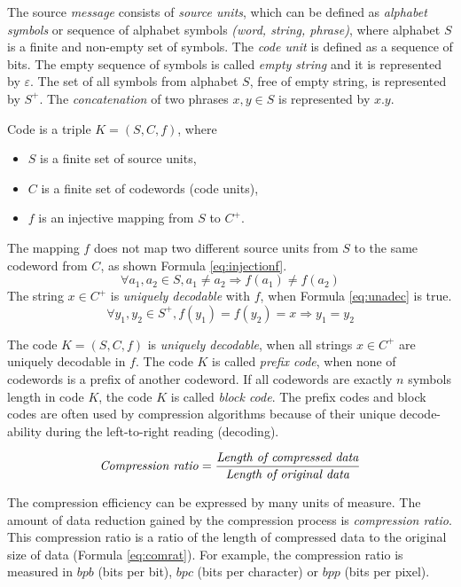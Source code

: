 \documentclass[thesis=M,english]{FITthesis}[2012/10/20]
\begin{document}
The source \textit{message} consists of \textit{source units}, which can be defined as \textit{alphabet symbols} or sequence of alphabet symbols \textit{(word, string, phrase)}, where alphabet $S$ is a finite and non-empty set of symbols. The \textit{code unit} is defined as a sequence of bits. The empty sequence of symbols is called \textit{empty string} and it is represented by $\varepsilon$. The set of all symbols from alphabet $S$, free of empty string, is represented by $S^+$. The \textit{concatenation} of two phrases $x,y \in S$ is represented by $x.y$.

Code is a triple $K=(S,C,f)$, where

\begin{itemize}
	\item $S$ is a finite set of source units,
	\item $C$ is a finite set of codewords (code units),
	\item $f$ is an injective mapping from $S$ to $C^+$.
\end{itemize}
The mapping $f$ does not map two different source units from $S$ to the same codeword from $C$, as shown Formula \ref{eq:injectionf}.
\begin{equation} \label{eq:injectionf}
\forall a_1,a_2 \in S,a_1 \neq a_2 \Rightarrow f(a_1) \neq f(a_2)
\end{equation}
The string $x \in C^+$ is \textit{uniquely decodable} with $f$, when Formula \ref{eq:unadec} is true.
\begin{equation} \label{eq:unadec}
\forall y_1,y_2 \in S^+,f(y_1)=f(y_2)=x \Rightarrow y_1=y_2
\end{equation}

The code $K=(S,C,f)$ is \textit{uniquely decodable}, when all strings $x \in C^+$ are uniquely decodable  in $f$. The code $K$ is called \textit{prefix code}, when none of codewords is a prefix of another codeword. If all codewords are exactly $n$ symbols length in code $K$, the code $K$ is called \textit{block code}. The prefix codes and block codes are often used by compression algorithms because of their unique decode-ability during the left-to-right reading (decoding).

\begin{equation} \label{eq:comrat}
\textrm{\textit{Compression ratio}} = \frac{\textrm{\textit{Length of compressed data}}}{\textrm{\textit{Length of original data}}}
\end{equation}

The compression efficiency can be expressed by many units of measure. The amount of data reduction gained by the compression process is \textit{compression ratio}. This compression ratio is a ratio of the length of compressed data to the original size of data (Formula \ref{eq:comrat}).
For example, the compression ratio is measured in $bpb$ (bits per bit), $bpc$ (bits per character) or $bpp$ (bits per pixel).
\end{document}
